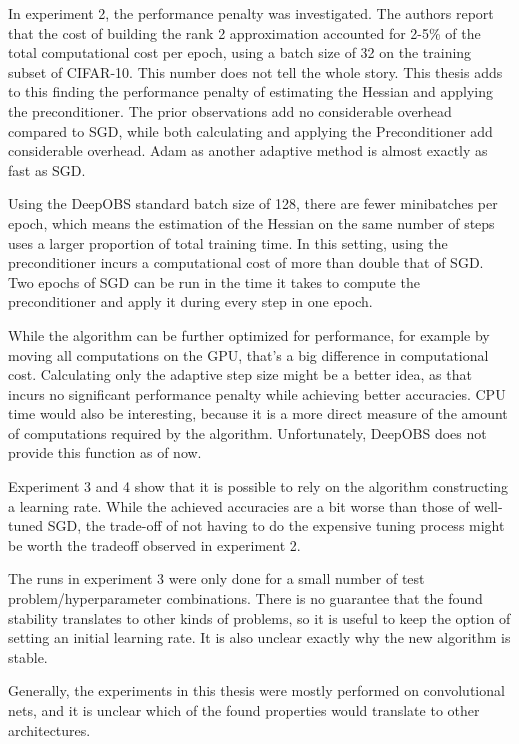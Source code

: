 \documentclass[twoside,12pt,a4paper]{report}
\begin{document}
In experiment 2, the performance penalty was investigated. The authors report that the cost of building the rank 2 approximation accounted for 2-5\% of the total computational cost per epoch, using a batch size of 32 on the training subset of CIFAR-10. This number does not tell the whole story. This thesis adds to this finding the performance penalty of estimating the Hessian and applying the preconditioner. The prior observations add no considerable overhead compared to SGD, while both calculating and applying the Preconditioner add considerable overhead. Adam as another adaptive method is almost exactly as fast as SGD.

Using the DeepOBS standard batch size of 128, there are fewer minibatches per epoch, which means the estimation of the Hessian on the same number of steps uses a larger proportion of total training time. In this setting, using the preconditioner incurs a computational cost of more than double that of SGD. Two epochs of SGD can be run in the time it takes to compute the preconditioner and apply it during every step in one epoch.

While the algorithm can be further optimized for performance, for example by moving all computations on the GPU, that's a big difference in computational cost. Calculating only the adaptive step size might be a better idea, as that incurs no significant performance penalty while achieving better accuracies.
CPU time would also be interesting, because it is a more direct measure of the amount of computations required by the algorithm. Unfortunately, DeepOBS does not provide this function as of now.

Experiment 3 and 4 show that it is possible to rely on the algorithm constructing a learning rate. While the achieved accuracies are a bit worse than those of well-tuned SGD, the trade-off of not having to do the expensive tuning process might be worth the tradeoff observed in experiment 2.

The runs in experiment 3 were only done for a small number of test problem/hyperparameter combinations. There is no guarantee that the found stability translates to other kinds of problems, so it is useful to keep the option of setting an initial learning rate. It is also unclear exactly why the new algorithm is stable.

Generally, the experiments in this thesis were mostly performed on convolutional nets, and it is unclear which of the found properties would translate to other architectures.
\end{document}
